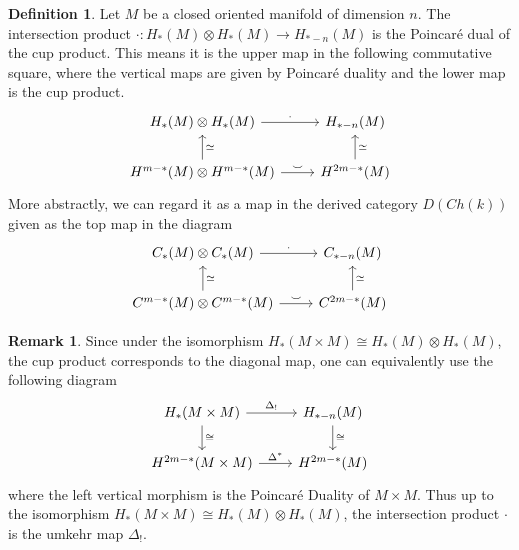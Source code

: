 \documentclass{scrartcl}
\theoremstyle{plain}
\theoremstyle{definition}
\newtheorem{definition}[theorem]{Definition}
\newtheorem{remark}[theorem]{Remark}
\newcommand{\cupp}{\mathbin{\smile}}
\newcommand{\iso}{\cong}
\newcommand{\quiso}{\simeq}
\begin{document}
\begin{definition}\label{def:loop-product-classical}
    Let $M$ be a closed oriented manifold of dimension $n$. 
The intersection product $\cdot\colon H_*(M)\otimes H_*(M)\to H_{*-n}(M)$ is the Poincaré dual of the cup product. This means it is the upper map in the following commutative square, where the vertical maps are given by Poincaré duality and the lower map is the cup product.
\begin{equation}
    \begin{tikzcd}
        H_*(M) \otimes H_*(M)  \rar["\cdot"] & H_{*-n}(M)  \\
        H^{m-*}(M)\otimes H^{m-*}(M) \uar[swap, "\quiso"] \rar["\cupp"] &  H^{2m-*}(M) \uar[swap, "\quiso"]
    \end{tikzcd}
\end{equation}
More abstractly, we can regard it as a map in the derived category $D(Ch(k))$ given as the top map in the diagram
\begin{equation}
    \begin{tikzcd}
        C_*(M) \otimes C_*(M)  \rar["\cdot"] & C_{*-n}(M)  \\
        C^{m-*}(M)\otimes C^{m-*}(M) \uar[swap, "\quiso"]\rar["\cupp"] &  C^{2m-*}(M) \uar[swap, "\quiso"]
    \end{tikzcd}
\end{equation}
\end{definition}
\begin{remark}
Since under the isomorphism $H_*(M\times M) \iso H_*(M)\otimes H_*(M)$, the cup product corresponds to the diagonal map, one can equivalently use the following diagram
\begin{equation}
    \begin{tikzcd}
        H_*(M\times M) \dar["\iso"] \rar["\Delta_!"] & H_{*-n}(M) \dar["\iso"] \\
        H^{2m-*}(M\times M) \rar["\Delta^*"] & H^{2m-*}(M)
    \end{tikzcd}
\end{equation}
where the left vertical morphism is the Poincaré Duality of $M\times M$. Thus up to the isomorphism $H_*(M\times M) \iso H_*(M)\otimes H_*(M)$, the intersection product $\cdot$ is the umkehr map $\Delta_!$.
\end{remark}
\end{document}
